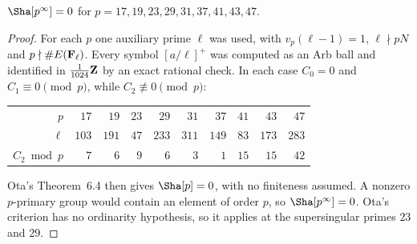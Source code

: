 \begin{theorem}\label{thm:singletons}
$\Sha[p^\infty]=0$ for $p=17,19,23,29,31,37,41,43,47$.
\end{theorem}
\begin{proof}
For each $p$ one auxiliary prime $\ell$ was used, with $v_p(\ell-1)=1$, $\ell\nmid pN$ and $p\nmid\#E(\mathbf{F}_\ell)$. Every symbol $[a/\ell]^+$ was computed as an Arb ball and identified in $\frac1{1024}\mathbf{Z}$ by an exact rational check. In each case $C_0=0$ and $C_1\equiv0\pmod p$, while $C_2\not\equiv0\pmod p$:
\begin{center}
\begin{tabular}{@{}rrrrrrrrrr@{}}
\toprule
$p$ & $17$ & $19$ & $23$ & $29$ & $31$ & $37$ & $41$ & $43$ & $47$\\
$\ell$ & $103$ & $191$ & $47$ & $233$ & $311$ & $149$ & $83$ & $173$ & $283$\\
$C_2\bmod p$ & $7$ & $6$ & $9$ & $6$ & $3$ & $1$ & $15$ & $15$ & $42$\\ \bottomrule
\end{tabular}
\end{center}
Ota's Theorem~6.4 \cite{ota} then gives $\Sha[p]=0$, with no finiteness assumed. A nonzero $p$-primary group would contain an element of order $p$, so $\Sha[p^\infty]=0$. Ota's criterion has no ordinarity hypothesis, so it applies at the supersingular primes $23$ and $29$.
\end{proof}


